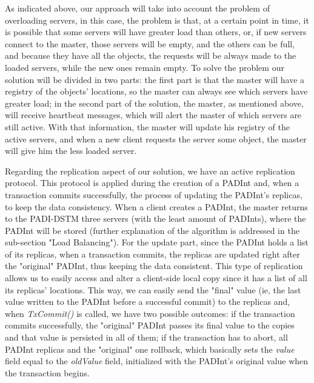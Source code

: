 \documentclass[times, 10pt,twocolumn]{article}
\begin{document}
As indicated above, our approach will take into account the problem of overloading servers, in this case, the problem is that, at a certain point in time, it is possible that some servers will have greater load than others, or, if new servers connect to the master, those servers will be empty, and the others can be full, and because they have all the objects, the requests will be always made to the loaded servers, while the new ones remain empty. To solve the problem our solution will be divided in two parts: the first part is that the master will have a registry of the objects' locations, so the master can always see which servers have greater load; in the second part of the solution, the master, as mentioned above, will receive heartbeat messages, which will alert the master of which servers are still active. With that information, the master will update his registry of the active servers, and when a new client requests the server some object, the master will give him the less loaded server. 

Regarding the replication aspect of our solution, we have an active replication protocol. This protocol is applied during the creation of a PADInt and, when a transaction commits successfully, the process of updating the PADInt's replicas, to keep the data consistency.
When a client creates a PADInt, the master returns to the PADI-DSTM three servers (with the least amount of PADInts), where the PADInt will be stored (further explanation of the algorithm is addressed in the sub-section "Load Balancing"). For the update part, since the PADInt holds a list of its replicas, when a transaction commits, the replicas are updated right after the "original" PADInt, thus keeping the data consistent.
This type of replication allows us to easily access and alter a client-side local copy since it has a list of all its replicas' locations. This way, we can easily send the "final" value (ie, the last value written to the PADInt before a successful commit) to the replicas and, when \emph{TxCommit()} is called, we have two possible outcomes: if the transaction commits successfully, the "original" PADInt passes its final value to the copies and that value is persisted in all of them; if the transaction has to abort, all PADInt replicas and the "original" one rollback, which basically sets the \emph{value} field equal to the \emph{oldValue} field, initialized with the PADInt's original value when the transaction begins.

\end{document}
